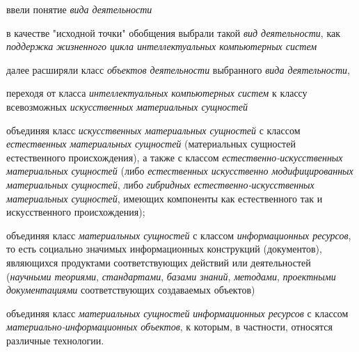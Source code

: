 \begin{textitemize}
	\item
	ввели понятие \textit{вида деятельности}
	\item
	в качестве "исходной точки"{} обобщения выбрали такой \textit{вид деятельности}, как \textit{поддержка} \textit{жизненного цикла интеллектуальных компьютерных систем}
	\item
	далее расширяли класс \textit{объектов деятельности} выбранного \textit{вида деятельности},
	
	\begin{textitemize}
		\item  переходя от класса \textit{интеллектуальных компьютерных систем} к классу всевозможных \textit{искусственных материальных сущностей}
		
		\item  объединяя класс \textit{искусственных материальных сущностей} с классом \textit{естественных материальных сущностей} (материальных сущностей естественного происхождения), а также с классом \textit{естественно-искусственных материальных сущностей} (либо \textit{естественных искусственно модифицированных материальных сущностей}, либо \textit{гибридных} \textit{естественно-искусственных материальных сущностей}, имеющих компоненты как естественного так и искусственного происхождения);
		
		\item объединяя класс \textit{материальных сущностей} с классом \textit{информационных ресурсов}, то есть социально значимых информационных конструкций (документов), являющихся продуктами соответствующих действий или деятельностей (\textit{научными теориями}, \textit{стандартами}, \textit{базами знаний}, \textit{методами}, \textit{проектными документациями} соответствующих создаваемых объектов)
		
		\item объединяя класс \textit{материальных сущностей} \textit{информационных ресурсов} с классом \textit{материально-информа\-ционных объектов}, к которым, в частности, относятся различные технологии.
	\end{textitemize}
\end{textitemize}

